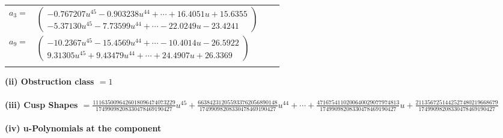 \documentclass[1p]{elsarticle_modified}
\theoremstyle{definition}
\begin{document}
\begin{tabular}{m{7pt} m{180pt} m{7pt} m{180pt} }
\flushright $a_{3}=$&$\begin{pmatrix}-0.767207 u^{45}-0.903238 u^{44}+\cdots+16.4051 u+15.6355\\-5.37130 u^{45}-7.73599 u^{44}+\cdots-22.0249 u-23.4241\end{pmatrix}$ \\
\flushright $a_{9}=$&$\begin{pmatrix}-10.2367 u^{45}-15.4569 u^{44}+\cdots-10.4014 u-26.5922\\9.31305 u^{45}+9.43479 u^{44}+\cdots+24.4907 u+26.3369\end{pmatrix}$\\&\end{tabular}
\flushleft \textbf{(ii) Obstruction class $= 1$}\\~\\
\flushleft \textbf{(iii) Cusp Shapes $= \frac{1116350096426018096474073229}{17499098208330478469190427} u^{45}+\frac{663842312055933762056890148}{17499098208330478469190427} u^{44}+\cdots+\frac{4716754110200640029077974813}{17499098208330478469190427} u+\frac{2113567251442527480219668679}{17499098208330478469190427}$}\\~\\
\newpage\renewcommand{\arraystretch}{1}
\flushleft \textbf{(iv) u-Polynomials at the component}\newline \\
\end{document}
